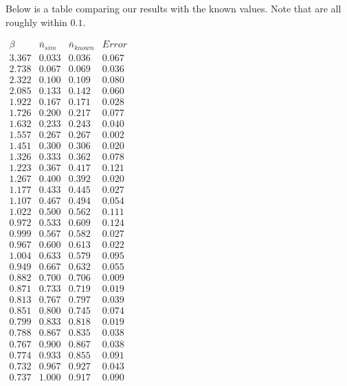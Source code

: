 \documentclass{article}
\begin{document}
\begin{enumerate}[i.]
    Below is a table comparing our results with the known values. Note that are all roughly within $0.1$.
    \begin{center}
      $\begin{array}{c|c|c|c}
        \beta & \bar{n}_{sim} & \bar{n}_{known} & Error \\ \hline
        3.367 & 0.033 & 0.036 & 0.067 \\ 
        2.738 & 0.067 & 0.069 & 0.036 \\ 
        2.322 & 0.100 & 0.109 & 0.080 \\ 
        2.085 & 0.133 & 0.142 & 0.060 \\ 
        1.922 & 0.167 & 0.171 & 0.028 \\ 
        1.726 & 0.200 & 0.217 & 0.077 \\ 
        1.632 & 0.233 & 0.243 & 0.040 \\ 
        1.557 & 0.267 & 0.267 & 0.002 \\ 
        1.451 & 0.300 & 0.306 & 0.020 \\ 
        1.326 & 0.333 & 0.362 & 0.078 \\ 
        1.223 & 0.367 & 0.417 & 0.121 \\ 
        1.267 & 0.400 & 0.392 & 0.020 \\ 
        1.177 & 0.433 & 0.445 & 0.027 \\ 
        1.107 & 0.467 & 0.494 & 0.054 \\ 
        1.022 & 0.500 & 0.562 & 0.111 \\ 
        0.972 & 0.533 & 0.609 & 0.124 \\ 
        0.999 & 0.567 & 0.582 & 0.027 \\ 
        0.967 & 0.600 & 0.613 & 0.022 \\ 
        1.004 & 0.633 & 0.579 & 0.095 \\ 
        0.949 & 0.667 & 0.632 & 0.055 \\ 
        0.882 & 0.700 & 0.706 & 0.009 \\ 
        0.871 & 0.733 & 0.719 & 0.019 \\ 
        0.813 & 0.767 & 0.797 & 0.039 \\ 
        0.851 & 0.800 & 0.745 & 0.074 \\ 
        0.799 & 0.833 & 0.818 & 0.019 \\ 
        0.788 & 0.867 & 0.835 & 0.038 \\ 
        0.767 & 0.900 & 0.867 & 0.038 \\ 
        0.774 & 0.933 & 0.855 & 0.091 \\ 
        0.732 & 0.967 & 0.927 & 0.043 \\ 
        0.737 & 1.000 & 0.917 & 0.090 \\ 
      \end{array}$
    \end{center}
\end{enumerate}
\end{document}
